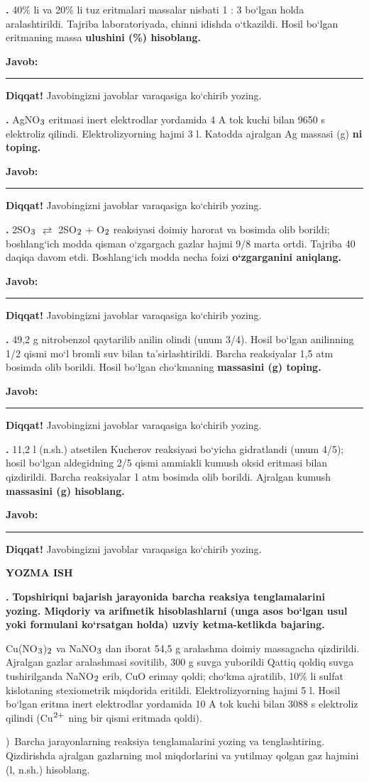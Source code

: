 \documentclass[11pt,a4paper]{article}
\renewcommand{\textsubscript}[1]{\ensuremath{_{\text{\fontsize{8}{8}\selectfont #1}}}}
\renewcommand{\textsuperscript}[1]{\ensuremath{^{\text{\fontsize{8}{8}\selectfont #1}}}}
\newcommand{\qn}[1]{\textbf{\fontsize{11.5}{13}\selectfont #1}}
\newcommand{\qsep}{\par\vspace{13pt}}
\newcommand{\javob}{\par\nopagebreak[4]\smallskip\noindent\textbf{Javob:} \rule[-2pt]{7.5cm}{0.4pt}\par\smallskip\noindent\textbf{Diqqat!} Javobingizni javoblar varaqasiga ko`chirib yozing.\par\medskip}
\begin{document}
\par\bigskip
\noindent\qn{36.} 40\% li va 20\% li tuz eritmalari massalar nisbati 1 : 3 bo`lgan holda aralashtirildi. Tajriba laboratoriyada, chinni idishda o`tkazildi. Hosil bo`lgan eritmaning massa \textbf{ulushini (\%) hisoblang.}
\javob\qsep
\noindent\qn{37.} AgNO\textsubscript{3} eritmasi inert elektrodlar yordamida 4 A tok kuchi bilan 9650 s elektroliz qilindi. Elektrolizyorning hajmi 3 l. Katodda ajralgan Ag massasi (g) \textbf{ni toping.}
\javob\qsep
\noindent\qn{38.} 2SO\textsubscript{3} $\rightleftarrows$ 2SO\textsubscript{2} + O\textsubscript{2} reaksiyasi doimiy harorat va bosimda olib borildi; boshlang`ich modda qisman o`zgargach gazlar hajmi 9/8 marta ortdi. Tajriba 40 daqiqa davom etdi. Boshlang`ich modda necha foizi \textbf{o`zgarganini aniqlang.}
\javob\qsep
\noindent\qn{39.} 49,2 g nitrobenzol qaytarilib anilin olindi (unum 3/4). Hosil bo`lgan anilinning 1/2 qismi mo`l bromli suv bilan ta'sirlashtirildi. Barcha reaksiyalar 1,5 atm bosimda olib borildi. Hosil bo`lgan cho`kmaning \textbf{massasini (g) toping.}
\javob\qsep
\noindent\qn{40.} 11,2 l (n.sh.) atsetilen Kucherov reaksiyasi bo`yicha gidratlandi (unum 4/5); hosil bo`lgan aldegidning 2/5 qismi ammiakli kumush oksid eritmasi bilan qizdirildi. Barcha reaksiyalar 1 atm bosimda olib borildi. Ajralgan kumush \textbf{massasini (g) hisoblang.}
\javob\qsep
\par\bigskip\begin{center}\textbf{\fontsize{13}{15}\selectfont YOZMA ISH}\end{center}
\noindent\qn{41.} \textbf{Topshiriqni bajarish jarayonida barcha reaksiya tenglamalarini yozing. Miqdoriy va arifmetik hisoblashlarni (unga asos bo`lgan usul yoki formulani ko`rsatgan holda) uzviy ketma-ketlikda bajaring.}\par\smallskip
Cu(NO\textsubscript{3})\textsubscript{2} va NaNO\textsubscript{3} dan iborat 54,5 g aralashma doimiy massagacha qizdirildi. Ajralgan gazlar aralashmasi sovitilib, 300 g suvga yuborildi Qattiq qoldiq suvga tushirilganda NaNO\textsubscript{2} erib, CuO erimay qoldi; cho`kma ajratilib, 10\% li sulfat kislotaning stexiometrik miqdorida eritildi. Elektrolizyorning hajmi 5 l. Hosil bo`lgan eritma inert elektrodlar yordamida 10 A tok kuchi bilan 3088 s elektroliz qilindi (Cu\textsuperscript{2+} ning bir qismi eritmada qoldi).\par
{})\ Barcha jarayonlarning reaksiya tenglamalarini yozing va tenglashtiring. Qizdirishda ajralgan gazlarning mol miqdorlarini va yutilmay qolgan gaz hajmini (l, n.sh.) hisoblang.\par
\end{document}
